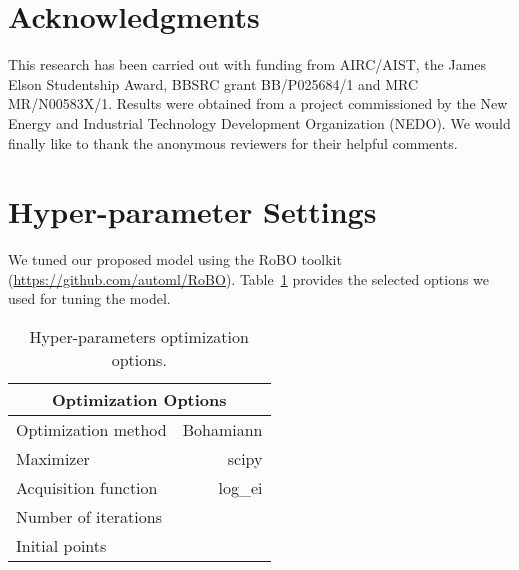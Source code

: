 \documentclass[11pt,a4paper]{article}
\begin{document}
    
    
\section*{Acknowledgments}
This research has been carried out with funding from AIRC/AIST, the James Elson Studentship Award, BBSRC grant BB/P025684/1 and MRC MR/N00583X/1. Results were obtained from a project commissioned by the New Energy and Industrial Technology Development Organization (NEDO). We would finally like to thank the anonymous reviewers for their helpful comments.


	
	
    \appendix
    
    \section{Hyper-parameter Settings}
    We tuned our proposed model using the RoBO toolkit (\url{https://github.com/automl/RoBO}). 
    Table~\ref{tab:opt} provides the selected options we used for tuning the model.
	\begin{table}[ht!]
		\centering
		\renewcommand*{\arraystretch}{1.1}
			\begin{tabular}{|l|r|}
				\hline
				\multicolumn{2}{|c|}{Optimization Options} \\
				\hline \hline
				Optimization method  & Bohamiann \\
				Maximizer 			 & scipy \\
				Acquisition function & log\_ei \\
				Number of iterations &  \\
				Initial points 		 &  \\
				\hline
			\end{tabular}
			\caption{Hyper-parameters optimization options.}
			\label{tab:opt}
		\end{table}
        
\end{document}
